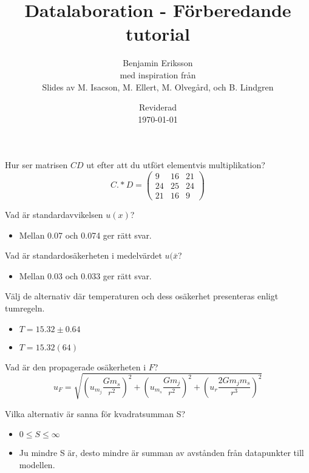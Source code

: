 \documentclass[9pt]{beamer}
\title{Datalaboration - Förberedande tutorial}
\author[benjamin.eriksson@physics.uu.se]{Benjamin Eriksson  \\ \tiny{med inspiration från} \\ \scriptsize{Slides av M. Isacson, M. Ellert, M. Olvegård, och B. Lindgren}}
\institute[Uppsala universitet]{{\small Avdelningen för tillämpad kärnfysik \\ Institutionen för fysik och astronomi} \\ \uulogo}
\date{{\small Reviderad}\\ \today}
\begin{document}
\begin{frame}{}
    Hur ser matrisen $CD$ ut efter att du utfört elementvis multiplikation?
    \begin{equation*}
        C. * D = 
        \begin{pmatrix}
        9 & 16  & 21 \\ 
        24 & 25 & 24 \\ 
        21 & 16 & 9 
        \end{pmatrix}
    \end{equation*}  
\end{frame}

\begin{frame}{}
    Vad är standardavvikelsen $u(x)$?
    \begin{itemize}
        \item Mellan 0.07 och 0.074 ger rätt svar.
    \end{itemize}
\end{frame}

\begin{frame}{}
    Vad är standardosäkerheten i medelvärdet $u(\bar{x}$?
    \begin{itemize}
        \item Mellan 0.03 och 0.033 ger rätt svar.
    \end{itemize}
\end{frame}

\begin{frame}{}
    Välj de alternativ där temperaturen och dess osäkerhet presenteras enligt tumregeln.
    \begin{itemize}
        \item $T = 15.32 \pm 0.64$
        \item $T = 15.32(64)$
    \end{itemize}
\end{frame}

\begin{frame}{}
    Vad är den propagerade osäkerheten i $F$?
    \begin{equation*}
        u_F = \sqrt{\left(u_{m_j}\frac{Gm_s}{r^2}\right)^2 + \left(u_{m_s} \frac{Gm_j}{r^2}\right)^2 + \left(u_r \frac{2Gm_jm_s}{r^3}\right)^2}
    \end{equation*}
\end{frame}

\begin{frame}{}
    Vilka alternativ är sanna för kvadratsumman S?
    \begin{itemize}
        \item $0 \leq S \leq \infty$
        \item Ju mindre S är, desto mindre är summan av avstånden från datapunkter till modellen.
    \end{itemize}
\end{frame}
\end{document}
